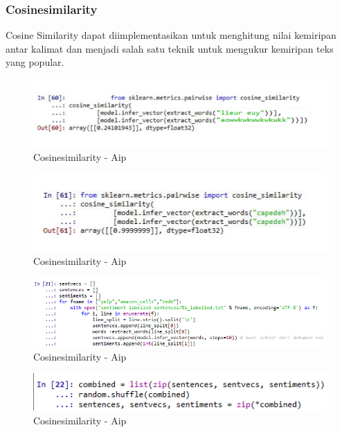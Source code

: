 \subsubsection{Cosinesimilarity}
Cosine Similarity dapat diimplementasikan untuk menghitung nilai kemiripan antar kalimat dan menjadi salah satu teknik untuk mengukur kemiripan  teks yang  popular. 
\begin{figure}[!hbtp]
\centering
\includegraphics[scale=0.3]{figures/AIP/e27.PNG}
\caption{Cosinesimilarity - Aip}
\label{Cosinesimilarity - Aip}
\end{figure}

\begin{figure}[!hbtp]
\centering
\includegraphics[scale=0.3]{figures/AIP/e28.PNG}
\caption{Cosinesimilarity - Aip}
\label{Cosinesimilarity - Aip}
\end{figure}

\begin{figure}[!hbtp]
\centering
\includegraphics[scale=0.3]{figures/AIP/e29.PNG}
\caption{Cosinesimilarity - Aip}
\label{Cosinesimilarity - Aip}
\end{figure}

\begin{figure}[!hbtp]
\centering
\includegraphics[scale=0.3]{figures/AIP/e30.PNG}
\caption{Cosinesimilarity - Aip}
\label{Cosinesimilarity - Aip}
\end{figure}

